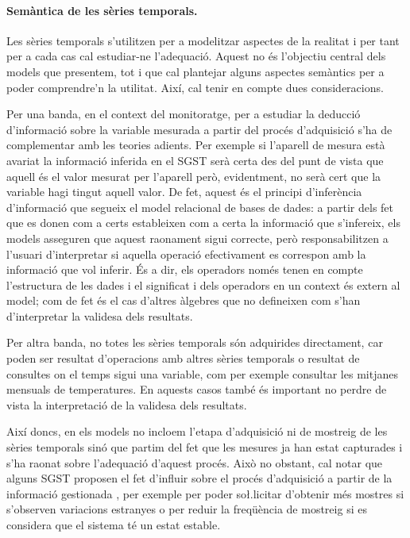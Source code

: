 \paragraph{Semàntica de les sèries temporals.}
Les sèries temporals s'utilitzen per a modelitzar aspectes de la
realitat i per tant per a cada cas cal estudiar-ne l'adequació. Aquest
no és l'objectiu central dels models que presentem, tot i que cal
plantejar alguns aspectes semàntics per a poder comprendre'n la
utilitat. Així, cal tenir en compte dues consideracions.


Per una banda, en el context del monitoratge, per a estudiar la
deducció d'informació sobre la variable mesurada a partir del procés
d'adquisició s'ha de complementar amb les teories adients.  Per
exemple si l'aparell de mesura està avariat la informació inferida en
el \gls{SGST} serà certa des del punt de vista que aquell és el valor
mesurat per l'aparell però, evidentment, no serà cert que la variable
hagi tingut aquell valor. De fet, aquest és el principi d'inferència
d'informació que segueix el model relacional de bases de dades: a
partir dels fet que es donen com a certs estableixen com a certa la
informació que s'infereix, els models asseguren que aquest raonament
sigui correcte, però responsabilitzen a l'usuari d'interpretar si
aquella operació efectivament es correspon amb la informació que vol
inferir. És a dir, els operadors només tenen en compte l'estructura de
les dades i el significat i dels operadors en un context és extern al
model; com de fet és el cas d'altres àlgebres que no defineixen com
s'han d'interpretar la validesa dels resultats.


Per altra banda, no totes les sèries temporals són adquirides
directament, car poden ser resultat d'operacions amb altres sèries
temporals o resultat de consultes on el temps sigui una variable, com
per exemple consultar les mitjanes mensuals de temperatures. %
En aquests casos també és important no perdre de vista la
interpretació de la validesa dels resultats.




Així doncs, en els models no incloem l'etapa d'adquisició ni de
mostreig de les sèries temporals sinó que partim del fet que les
mesures ja han estat capturades i s'ha raonat sobre l'adequació
d'aquest procés. Això no obstant, cal notar que alguns \gls{SGST}
proposen el fet d'influir sobre el procés d'adquisició a partir de la
informació gestionada \parencite{madden05}, per exemple per poder
so\l.licitar d'obtenir més mostres si s'observen variacions estranyes
o per reduir la freqüència de mostreig si es considera que el sistema
té un estat estable.






